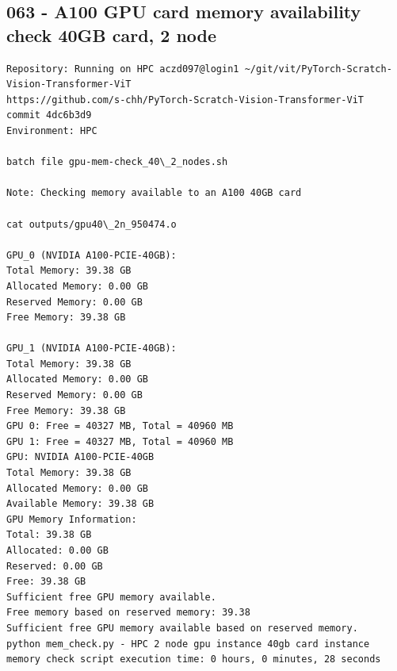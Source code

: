 \subsection{063 - A100 GPU card memory availability check 40GB card, 2 node}
\label{app_res:063}
\begin{verbatim}
Repository: Running on HPC aczd097@login1 ~/git/vit/PyTorch-Scratch-Vision-Transformer-ViT
https://github.com/s-chh/PyTorch-Scratch-Vision-Transformer-ViT
commit 4dc6b3d9
Environment: HPC

batch file gpu-mem-check_40\_2_nodes.sh

Note: Checking memory available to an A100 40GB card 

cat outputs/gpu40\_2n_950474.o

GPU_0 (NVIDIA A100-PCIE-40GB):
Total Memory: 39.38 GB
Allocated Memory: 0.00 GB
Reserved Memory: 0.00 GB
Free Memory: 39.38 GB

GPU_1 (NVIDIA A100-PCIE-40GB):
Total Memory: 39.38 GB
Allocated Memory: 0.00 GB
Reserved Memory: 0.00 GB
Free Memory: 39.38 GB
GPU 0: Free = 40327 MB, Total = 40960 MB
GPU 1: Free = 40327 MB, Total = 40960 MB
GPU: NVIDIA A100-PCIE-40GB
Total Memory: 39.38 GB
Allocated Memory: 0.00 GB
Available Memory: 39.38 GB
GPU Memory Information:
Total: 39.38 GB
Allocated: 0.00 GB
Reserved: 0.00 GB
Free: 39.38 GB
Sufficient free GPU memory available.
Free memory based on reserved memory: 39.38
Sufficient free GPU memory available based on reserved memory.
python mem_check.py - HPC 2 node gpu instance 40gb card instance memory check script execution time: 0 hours, 0 minutes, 28 seconds
            
\end{verbatim}

